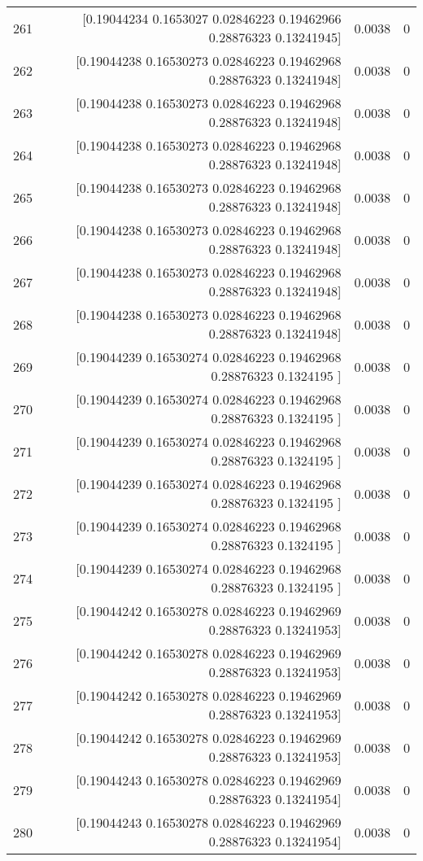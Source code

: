 \begin{longtable}{lrrr}
261 & [0.19044234 0.1653027  0.02846223 0.19462966 0.28876323 0.13241945] & 0.0038 & 0 \\
262 & [0.19044238 0.16530273 0.02846223 0.19462968 0.28876323 0.13241948] & 0.0038 & 0 \\
263 & [0.19044238 0.16530273 0.02846223 0.19462968 0.28876323 0.13241948] & 0.0038 & 0 \\
264 & [0.19044238 0.16530273 0.02846223 0.19462968 0.28876323 0.13241948] & 0.0038 & 0 \\
265 & [0.19044238 0.16530273 0.02846223 0.19462968 0.28876323 0.13241948] & 0.0038 & 0 \\
266 & [0.19044238 0.16530273 0.02846223 0.19462968 0.28876323 0.13241948] & 0.0038 & 0 \\
267 & [0.19044238 0.16530273 0.02846223 0.19462968 0.28876323 0.13241948] & 0.0038 & 0 \\
268 & [0.19044238 0.16530273 0.02846223 0.19462968 0.28876323 0.13241948] & 0.0038 & 0 \\
269 & [0.19044239 0.16530274 0.02846223 0.19462968 0.28876323 0.1324195 ] & 0.0038 & 0 \\
270 & [0.19044239 0.16530274 0.02846223 0.19462968 0.28876323 0.1324195 ] & 0.0038 & 0 \\
271 & [0.19044239 0.16530274 0.02846223 0.19462968 0.28876323 0.1324195 ] & 0.0038 & 0 \\
272 & [0.19044239 0.16530274 0.02846223 0.19462968 0.28876323 0.1324195 ] & 0.0038 & 0 \\
273 & [0.19044239 0.16530274 0.02846223 0.19462968 0.28876323 0.1324195 ] & 0.0038 & 0 \\
274 & [0.19044239 0.16530274 0.02846223 0.19462968 0.28876323 0.1324195 ] & 0.0038 & 0 \\
275 & [0.19044242 0.16530278 0.02846223 0.19462969 0.28876323 0.13241953] & 0.0038 & 0 \\
276 & [0.19044242 0.16530278 0.02846223 0.19462969 0.28876323 0.13241953] & 0.0038 & 0 \\
277 & [0.19044242 0.16530278 0.02846223 0.19462969 0.28876323 0.13241953] & 0.0038 & 0 \\
278 & [0.19044242 0.16530278 0.02846223 0.19462969 0.28876323 0.13241953] & 0.0038 & 0 \\
279 & [0.19044243 0.16530278 0.02846223 0.19462969 0.28876323 0.13241954] & 0.0038 & 0 \\
280 & [0.19044243 0.16530278 0.02846223 0.19462969 0.28876323 0.13241954] & 0.0038 & 0 \\

\end{longtable}
